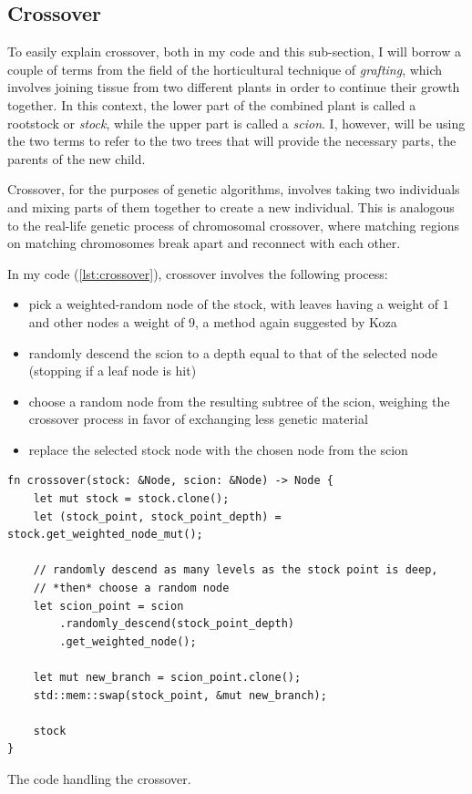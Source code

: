\documentclass{report}
\newenvironment{code}{\captionsetup{type=listing}}{}
\begin{document}
\subsection{Crossover}

To easily explain crossover, both in my code and this sub-section, I will borrow a couple of terms from the field of the horticultural technique of \emph{grafting}, which involves joining tissue from two different plants in order to continue their growth together. In this context, the lower part of the combined plant is called a rootstock or \emph{stock}, while the upper part is called a \emph{scion}. I, however, will be using the two terms to refer to the two trees that will provide the necessary parts, the parents of the new child.

Crossover, for the purposes of genetic algorithms, involves taking two individuals and mixing parts of them together to create a new individual. This is analogous to the real-life genetic process of chromosomal crossover, where matching regions on matching chromosomes break apart and reconnect with each other.

In my code (\autoref{lst:crossover}), crossover involves the following process:
\begin{itemize}
    \label{weighted_random}
    \item pick a weighted-random node of the stock, with leaves having a weight of $1$ and other nodes a weight of $9$, a method again suggested by Koza\cite{koza}
    \item randomly descend the scion to a depth equal to that of the selected node (stopping if a leaf node is hit)
    \item choose a random node from the resulting subtree of the scion, weighing the crossover process in favor of exchanging less genetic material
    \item replace the selected stock node with the chosen node from the scion
\end{itemize}

\begin{code}
    \begin{verbatim}
fn crossover(stock: &Node, scion: &Node) -> Node {
    let mut stock = stock.clone();
    let (stock_point, stock_point_depth) = stock.get_weighted_node_mut();

    // randomly descend as many levels as the stock point is deep, 
    // *then* choose a random node
    let scion_point = scion
        .randomly_descend(stock_point_depth)
        .get_weighted_node();

    let mut new_branch = scion_point.clone();
    std::mem::swap(stock_point, &mut new_branch);

    stock
}
    \end{verbatim}
    \caption{The code handling the crossover.}
    \label{lst:crossover}
\end{code}
\end{document}

